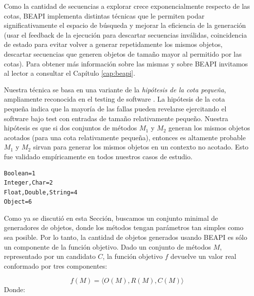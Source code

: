 Como la cantidad de secuencias a explorar crece exponencialmente respecto de las cotas, BEAPI implementa distintas técnicas que le permiten podar significativamente el espacio de búsqueda y mejorar la eficiencia de la generación (usar el feedback de la ejecución para descartar secuencias inválidas, coincidencia de estado para evitar volver a generar repetidamente los mismos objetos, descartar secuencias que generen objetos de tamaño mayor al permitido por las cotas). Para obtener más información sobre las mismas y sobre BEAPI invitamos al lector a consultar el Capítulo \ref{cap:beapi}.

Nuestra técnica se basa en una variante de la \emph{hipótesis de la cota pequeña}, ampliamente reconocida en el testing de software \cite{Andoni:2003,jackson2006, Abad13}. La hipótesis de la cota pequeña indica que la mayoría de las fallas pueden revelarse ejercitando el software bajo test con entradas de tamaño relativamente pequeño. Nuestra hipótesis es que si dos conjuntos de métodos $M_1$ y $M_2$ generan los mismos objetos acotados (para una cota relativamente pequeña), entonces es altamente probable $M_1$ y $M_2$ sirvan para generar los mismos objetos en un contexto no acotado. Esto fue validado empíricamente en todos nuestros casos de estudio.

\begin{lstlisting}[label=fig:rankParameters,caption=Ranking con los tipos de parametros, captionpos=b,frame=tb, float=t]
Boolean=1
Integer,Char=2
Float,Double,String=4
Object=6
\end{lstlisting}

Como ya se discutió en esta Sección, buscamos un conjunto minimal de generadores de objetos, donde los métodos tengan parámetros tan simples como sea posible. Por lo tanto, la cantidad de objetos generados usando BEAPI es sólo un componente de la función objetivo. Dado un conjunto de métodos $M$, representado por un candidato $C$, la función objetivo $f$ devuelve un valor real conformado por tres componentes:

\[
f(M) = \langle O(M), R(M), C(M) \rangle
\]
Donde:

